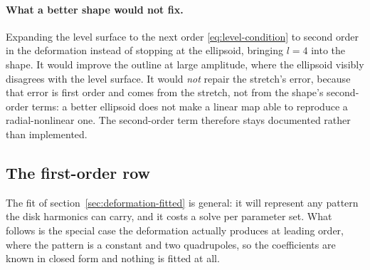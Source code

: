 \paragraph{What a better shape would not fix.}  Expanding the level surface to the next order
\eqref{eq:level-condition} to second order in the deformation instead of stopping at the
ellipsoid, bringing $l = 4$ into the shape.  It would improve the outline at large amplitude,
where the ellipsoid visibly disagrees with the level surface.  It would \emph{not} repair the
stretch's error, because that error is first order and comes from the stretch, not from the
shape's second-order terms: a better ellipsoid does not make a linear map able to reproduce a
radial-nonlinear one.  The second-order term therefore stays documented rather than implemented.

\subsection{The first-order row}
\label{sec:deformation-first-order}

The fit of section~\ref{sec:deformation-fitted} is general: it will represent any pattern the
disk harmonics can carry, and it costs a solve per parameter set.  What follows is the special case the deformation actually produces at
leading order, where the pattern is a constant and two quadrupoles, so the coefficients are known
in closed form and nothing is fitted at all.


